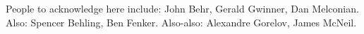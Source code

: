 

\clearpage
\begin{acknowledgement}
People to acknowledge here include:  John Behr, Gerald Gwinner, Dan Melconian.  Also:  Spencer Behling, Ben Fenker.  Also-also: Alexandre Gorelov, James McNeil.
\end{acknowledgement}
